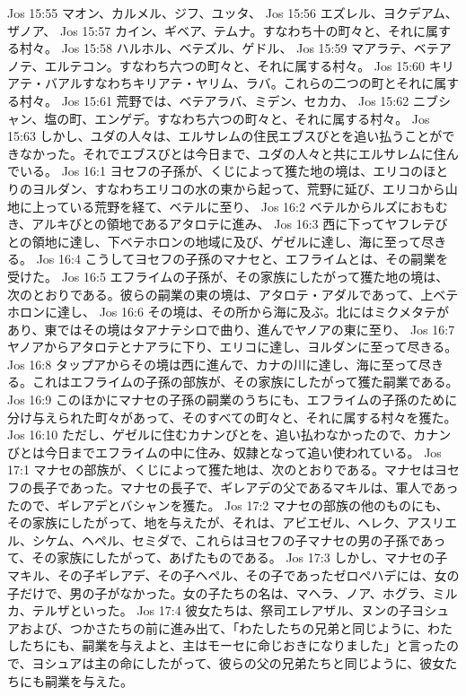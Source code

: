 Jos 15:55  マオン、カルメル、ジフ、ユッタ、
Jos 15:56  エズレル、ヨクデアム、ザノア、
Jos 15:57  カイン、ギベア、テムナ。すなわち十の町々と、それに属する村々。
Jos 15:58  ハルホル、ベテズル、ゲドル、
Jos 15:59  マアラテ、ベテアノテ、エルテコン。すなわち六つの町々と、それに属する村々。
Jos 15:60  キリアテ・バアルすなわちキリアテ・ヤリム、ラバ。これらの二つの町とそれに属する村々。
Jos 15:61  荒野では、ベテアラバ、ミデン、セカカ、
Jos 15:62  ニブシャン、塩の町、エンゲデ。すなわち六つの町々と、それに属する村々。
Jos 15:63  しかし、ユダの人々は、エルサレムの住民エブスびとを追い払うことができなかった。それでエブスびとは今日まで、ユダの人々と共にエルサレムに住んでいる。
Jos 16:1  ヨセフの子孫が、くじによって獲た地の境は、エリコのほとりのヨルダン、すなわちエリコの水の東から起って、荒野に延び、エリコから山地に上っている荒野を経て、ベテルに至り、
Jos 16:2  ベテルからルズにおもむき、アルキびとの領地であるアタロテに進み、
Jos 16:3  西に下ってヤフレテびとの領地に達し、下ベテホロンの地域に及び、ゲゼルに達し、海に至って尽きる。
Jos 16:4  こうしてヨセフの子孫のマナセと、エフライムとは、その嗣業を受けた。
Jos 16:5  エフライムの子孫が、その家族にしたがって獲た地の境は、次のとおりである。彼らの嗣業の東の境は、アタロテ・アダルであって、上ベテホロンに達し、
Jos 16:6  その境は、その所から海に及ぶ。北にはミクメタテがあり、東ではその境はタアナテシロで曲り、進んでヤノアの東に至り、
Jos 16:7  ヤノアからアタロテとナアラに下り、エリコに達し、ヨルダンに至って尽きる。
Jos 16:8  タップアからその境は西に進んで、カナの川に達し、海に至って尽きる。これはエフライムの子孫の部族が、その家族にしたがって獲た嗣業である。
Jos 16:9  このほかにマナセの子孫の嗣業のうちにも、エフライムの子孫のために分け与えられた町々があって、そのすべての町々と、それに属する村々を獲た。
Jos 16:10  ただし、ゲゼルに住むカナンびとを、追い払わなかったので、カナンびとは今日までエフライムの中に住み、奴隷となって追い使われている。
Jos 17:1  マナセの部族が、くじによって獲た地は、次のとおりである。マナセはヨセフの長子であった。マナセの長子で、ギレアデの父であるマキルは、軍人であったので、ギレアデとバシャンを獲た。
Jos 17:2  マナセの部族の他のものにも、その家族にしたがって、地を与えたが、それは、アビエゼル、ヘレク、アスリエル、シケム、ヘペル、セミダで、これらはヨセフの子マナセの男の子孫であって、その家族にしたがって、あげたものである。
Jos 17:3  しかし、マナセの子マキル、その子ギレアデ、その子ヘペル、その子であったゼロペハデには、女の子だけで、男の子がなかった。女の子たちの名は、マヘラ、ノア、ホグラ、ミルカ、テルザといった。
Jos 17:4  彼女たちは、祭司エレアザル、ヌンの子ヨシュアおよび、つかさたちの前に進み出て、「わたしたちの兄弟と同じように、わたしたちにも、嗣業を与えよと、主はモーセに命じおきになりました」と言ったので、ヨシュアは主の命にしたがって、彼らの父の兄弟たちと同じように、彼女たちにも嗣業を与えた。
